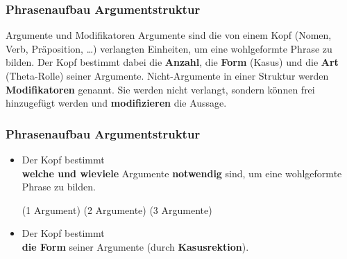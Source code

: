 \begin{frame}
\frametitle{Phrasenaufbau \ras Argumentstruktur}

\begin{block}{Argumente und Modifikatoren}
Argumente sind die von einem Kopf (Nomen, Verb, Präposition, \dots ) verlangten Einheiten, um eine wohlgeformte Phrase zu bilden. Der Kopf bestimmt dabei die \textbf{Anzahl}, die \textbf{Form} (\zB Kasus) und die \textbf{Art} (\zB Theta-Rolle) seiner Argumente. Nicht-Argumente in einer Struktur werden \textbf{Modifikatoren} genannt. Sie werden nicht verlangt, sondern können frei hinzugefügt werden und \textbf{modifizieren} die Aussage. 
\end{block}

\end{frame}


\begin{frame}
\frametitle{Phrasenaufbau \ras Argumentstruktur}

\begin{itemize}
	\item Der Kopf bestimmt\\ 
	\textbf{welche und wieviele} Argumente \textbf{notwendig} sind, um eine wohlgeformte Phrase zu bilden.


\eal 
{} \hfill (1 Argument)
 \hfill (2 Argumente)
 \hfill (3 Argumente)
\zl

\pause

\eal
{}
\zl


\end{itemize}
\end{frame}


\begin{frame}

\begin{itemize}
	\item Der Kopf bestimmt\\ 
	\textbf{die Form} seiner Argumente (\zB durch \textbf{Kasusrektion}).
\end{itemize}

\eal 
{}
\zl

\pause

\eal
{}
\zl

\end{frame}


